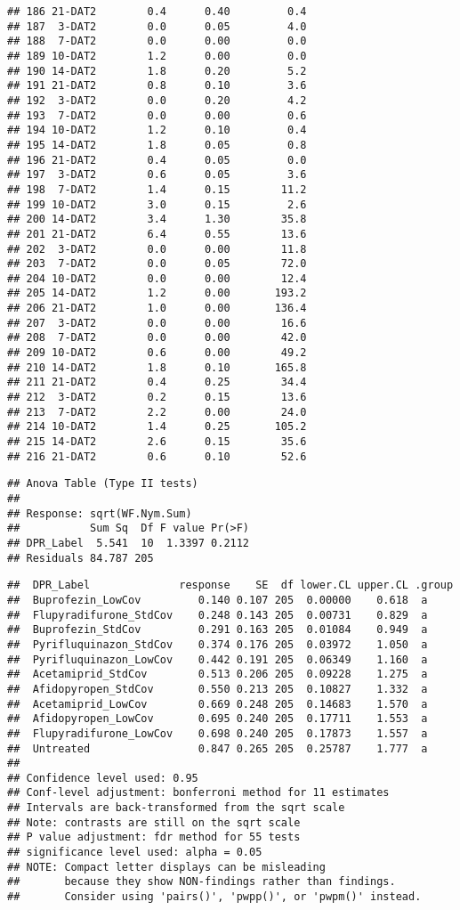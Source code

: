 \documentclass[
]{article}
\begin{document}
\begin{verbatim}
## 186 21-DAT2        0.4      0.40         0.4
## 187  3-DAT2        0.0      0.05         4.0
## 188  7-DAT2        0.0      0.00         0.0
## 189 10-DAT2        1.2      0.00         0.0
## 190 14-DAT2        1.8      0.20         5.2
## 191 21-DAT2        0.8      0.10         3.6
## 192  3-DAT2        0.0      0.20         4.2
## 193  7-DAT2        0.0      0.00         0.6
## 194 10-DAT2        1.2      0.10         0.4
## 195 14-DAT2        1.8      0.05         0.8
## 196 21-DAT2        0.4      0.05         0.0
## 197  3-DAT2        0.6      0.05         3.6
## 198  7-DAT2        1.4      0.15        11.2
## 199 10-DAT2        3.0      0.15         2.6
## 200 14-DAT2        3.4      1.30        35.8
## 201 21-DAT2        6.4      0.55        13.6
## 202  3-DAT2        0.0      0.00        11.8
## 203  7-DAT2        0.0      0.05        72.0
## 204 10-DAT2        0.0      0.00        12.4
## 205 14-DAT2        1.2      0.00       193.2
## 206 21-DAT2        1.0      0.00       136.4
## 207  3-DAT2        0.0      0.00        16.6
## 208  7-DAT2        0.0      0.00        42.0
## 209 10-DAT2        0.6      0.00        49.2
## 210 14-DAT2        1.8      0.10       165.8
## 211 21-DAT2        0.4      0.25        34.4
## 212  3-DAT2        0.2      0.15        13.6
## 213  7-DAT2        2.2      0.00        24.0
## 214 10-DAT2        1.4      0.25       105.2
## 215 14-DAT2        2.6      0.15        35.6
## 216 21-DAT2        0.6      0.10        52.6
\end{verbatim}

\begin{verbatim}
## Anova Table (Type II tests)
## 
## Response: sqrt(WF.Nym.Sum)
##           Sum Sq  Df F value Pr(>F)
## DPR_Label  5.541  10  1.3397 0.2112
## Residuals 84.787 205
\end{verbatim}

\begin{verbatim}
##  DPR_Label              response    SE  df lower.CL upper.CL .group
##  Buprofezin_LowCov         0.140 0.107 205  0.00000    0.618  a    
##  Flupyradifurone_StdCov    0.248 0.143 205  0.00731    0.829  a    
##  Buprofezin_StdCov         0.291 0.163 205  0.01084    0.949  a    
##  Pyrifluquinazon_StdCov    0.374 0.176 205  0.03972    1.050  a    
##  Pyrifluquinazon_LowCov    0.442 0.191 205  0.06349    1.160  a    
##  Acetamiprid_StdCov        0.513 0.206 205  0.09228    1.275  a    
##  Afidopyropen_StdCov       0.550 0.213 205  0.10827    1.332  a    
##  Acetamiprid_LowCov        0.669 0.248 205  0.14683    1.570  a    
##  Afidopyropen_LowCov       0.695 0.240 205  0.17711    1.553  a    
##  Flupyradifurone_LowCov    0.698 0.240 205  0.17873    1.557  a    
##  Untreated                 0.847 0.265 205  0.25787    1.777  a    
## 
## Confidence level used: 0.95 
## Conf-level adjustment: bonferroni method for 11 estimates 
## Intervals are back-transformed from the sqrt scale 
## Note: contrasts are still on the sqrt scale 
## P value adjustment: fdr method for 55 tests 
## significance level used: alpha = 0.05 
## NOTE: Compact letter displays can be misleading
##       because they show NON-findings rather than findings.
##       Consider using 'pairs()', 'pwpp()', or 'pwpm()' instead.
\end{verbatim}
\end{document}
